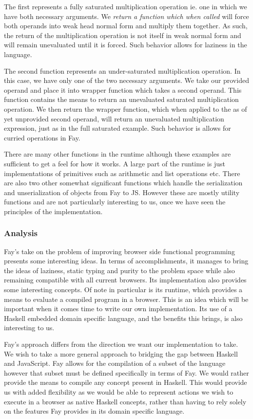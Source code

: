 The first represents a fully saturated multiplication operation ie. one
in which we have both necessary arguments. We \emph{return a function
which when called} will force both operands into weak head normal form
and multiply them together. As such, the return of the multiplication
operation is not itself in weak normal form and will remain unevaluated
until it is forced. Such behavior allows for laziness in the language.

The second function represents an under-saturated multiplication operation.
In this case, we have only one of the two necessary arguments. We take
our provided operand and place it into wrapper function which takes a second
operand. This function contains the means to return an unevaluated
saturated multiplication operation. We then return the wrapper function, 
which when applied to the as of yet unprovided second operand, will return
an unevaluated multiplication expression, just as in the full saturated example.
Such behavior is allows for curried operations in Fay.

There are many other functions in the runtime although these examples
are sufficient to get a feel for how it works. A large part of the runtime
is just implementations of primitives such as arithmetic and list operations
etc. There are also two other somewhat significant functions which handle
the serialization and unserialization of objects from Fay to JS. However
these are mostly utility functions and are not particularly interesting
to us, once we have seen the principles of the implementation.

\subsubsection{Analysis}
Fay's take on the problem of improving browser side functional programming
presents some interesting ideas. In terms of accomplishments, it manages
to bring the ideas of laziness, static typing and purity to the problem
space while also remaining compatible with all current browsers. Its
implementation also provides some interesting concepts. Of note in particular
is its runtime, which provides a means to evaluate a compiled program in a
browser. This is an idea which will be important when it comes time to write
our own implementation. Its use of a Haskell embedded domain specific 
language, and the benefits this brings, is also interesting to us.

Fay's approach differs from the direction we want our implementation to take.
We wish to take a more general approach to bridging the gap between Haskell
and JavaScript. Fay allows for the compilation of a subset of the language
however that subset must be defined specifically in terms of Fay. We would
rather provide the means to compile any concept present in Haskell. This
would provide us with added flexibility as we would be able to represent
actions we wish to execute in a browser as native Haskell concepts, rather
than having to rely solely on the features Fay provides in its domain 
specific language.

